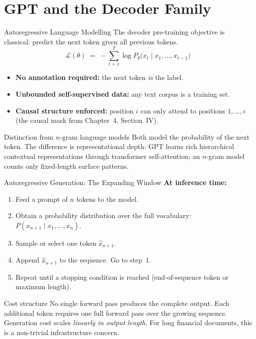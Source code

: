 \documentclass[11pt,aspectratio=169,professionalfonts]{beamer}
\begin{document}
\section{GPT and the Decoder Family}
%
\begin{frame}{Autoregressive Language Modelling}
  The decoder pre-training objective is classical:
  predict the next token given all previous tokens.
  \[
    \mathcal{L}(\theta)
    \;=\;
    -\sum_{t=1}^{T}
    \log P_\theta\!\bigl(x_t \mid x_1,\ldots,x_{t-1}\bigr)
  \]

  \begin{itemize}
    \item \textbf{No annotation required:} the next token \emph{is} the label.
    \item \textbf{Unbounded self-supervised data:} any text corpus is a
          training set.
    \item \textbf{Causal structure enforced:} position $i$ can only attend
          to positions $1,\ldots,i$ (the causal mask from Chapter~4,
          Section~IV).
  \end{itemize}

  \begin{block}{Distinction from $n$-gram language models}
    Both model the probability of the next token.
    The difference is representational depth: GPT learns rich hierarchical
    contextual representations through transformer self-attention;
    an $n$-gram model counts only fixed-length surface patterns.
  \end{block}
\end{frame}
%
%
\begin{frame}{Autoregressive Generation: The Expanding Window}
  \textbf{At inference time:}
  \begin{enumerate}
    \item Feed a prompt of $n$ tokens to the model.
    \item Obtain a probability distribution over the full vocabulary:
          $P(x_{n+1}\mid x_1,\ldots,x_n)$.
    \item Sample or select one token $\hat{x}_{n+1}$.
    \item Append $\hat{x}_{n+1}$ to the sequence.
          Go to step~1.
    \item Repeat until a stopping condition is reached
          (end-of-sequence token or maximum length).
  \end{enumerate}

  \begin{alertblock}{Cost structure}
    No single forward pass produces the complete output.
    Each additional token requires one full forward pass over the
    growing sequence.
    Generation cost scales \emph{linearly in output length}.
    For long financial documents, this is a non-trivial infrastructure concern.
  \end{alertblock}
\end{frame}
\end{document}

